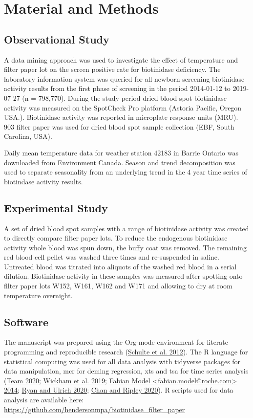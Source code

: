 \documentclass[review]{elsarticle}
\begin{document}
\section*{Material and Methods}
\label{sec:org6feb36b}
\subsection*{Observational Study}
\label{sec:orgcf9a588}
A data mining approach was used to investigate the effect of
temperature and filter paper lot on the screen positive rate for
biotinidase deficiency. The laboratory information system was queried
for all newborn screening biotinidase activity results from the first
phase of screening in the period 2014-01-12 to 2019-07-27 (n =
798,770). During the study period dried blood spot biotinidase
activity was measured on the SpotCheck Pro platform (Astoria Pacific,
Oregon USA.). Biotinidase activity was reported in microplate response
units (MRU). 903 filter paper was used for dried blood spot sample
collection (EBF, South Carolina, USA).

Daily mean temperature data for weather station 42183 in Barrie
Ontario was downloaded from Environment Canada. Season and trend
decomposition was used to separate seasonality from an underlying
trend in the 4 year time series of biotindase activity results.

\subsection*{Experimental Study}
\label{sec:org444be51}

A set of dried blood spot samples with a range of biotinidase activity
was created to directly compare filter paper lots. To reduce the
endogenous biotinidase activity whole blood was spun down, the buffy
coat was removed. The remaining red blood cell pellet was washed three
times and re-suspended in saline. Untreated blood was titrated into
aliquots of the washed red blood in a serial dilution. Biotinidase
activity in these samples was measured after spotting onto filter
paper lots W152, W161, W162 and W171 and allowing to dry at room
temperature overnight.

\subsection*{Software}
\label{sec:orgb030f07}
The manuscript was prepared using the Org-mode environment for
literate programming and reproducible research (\hyperlink{citeproc_bib_item_9}{Schulte et al. 2012}). The R language for statistical computing was used
for all data analysis with tidyverse packages for data manipulation,
mcr for deming regression, xts and tsa for time series analysis (\hyperlink{citeproc_bib_item_11}{Team 2020}; \hyperlink{citeproc_bib_item_14}{Wickham et al. 2019}; \hyperlink{citeproc_bib_item_4}{Fabian Model <fabian.model@roche.com> 2014}; \hyperlink{citeproc_bib_item_8}{Ryan and Ulrich 2020}; \hyperlink{citeproc_bib_item_3}{Chan and Ripley 2020}). R scripts used for data
analysis are available here:
\url{https://github.com/hendersonmpa/biotinidase\_filter\_paper}
\end{document}
